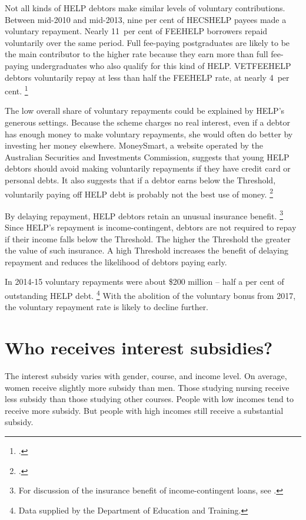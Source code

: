 \documentclass{grattan}
\begin{document}
Not all kinds of \gls{HELP} debtors make similar levels of voluntary contributions.
Between mid-2010 and mid-2013, nine per cent of \gls{HECSHELP} payees made a voluntary repayment.
Nearly 11~per cent of \gls{FEEHELP} borrowers repaid voluntarily over the same period.
Full fee-paying postgraduates are likely to be the main contributor to the higher rate because they earn more than full fee-paying undergraduates who also qualify for this kind of \gls{HELP}\@.
\gls{VETFEEHELP} debtors voluntarily repay at less than half the \gls{FEEHELP} rate, at nearly 4~per cent.%
\footcite[][33]{ANAO2016AdministrationHigherEducation}

The low overall share of voluntary repayments could be explained by \gls{HELP}'s generous settings.
Because the scheme charges no real interest, even if a debtor has enough money to make voluntary repayments, she would often do better by investing her money elsewhere.
MoneySmart, a website operated by the Australian Securities and Investments Commission, suggests that young \gls{HELP} debtors should avoid making voluntarily repayments if they have credit card or personal debts.
It also suggests that if a debtor earns below the \gls{Threshold}, voluntarily paying off \gls{HELP} debt is probably not the best use of money.%
\footcite{MoneySmart2016Payingyouruni}

By delaying repayment, \gls{HELP} debtors retain an unusual insurance benefit.%
   \footnote{For discussion of the insurance benefit of income-contingent loans, see \textcite[][36]{Chapman2014Incomecontingentloans}.} 
Since \gls{HELP}'s repayment is income-contingent, debtors are not required to repay if their income falls below the \gls{Threshold}.
The higher the \gls{Threshold} the greater the value of such insurance. A high \gls{Threshold} increases the benefit of delaying repayment and reduces the likelihood of debtors paying early.

In 2014-15 voluntary repayments were about \$200 million -- half a per cent of outstanding \gls{HELP} debt.%
   \footnote{Data supplied by the Department of Education and Training.} With the abolition of the voluntary bonus from 2017, the voluntary repayment rate is likely to decline further.

\chapter{Who receives interest subsidies?}\label{chap:3-who-receives-interest-subsidies}

The interest subsidy varies with gender, course, and income level. On average, women receive slightly more subsidy than men. Those studying nursing receive less subsidy than those studying other courses. People with low incomes tend to receive more subsidy. But people with high incomes still receive a substantial subsidy. 
\end{document}
